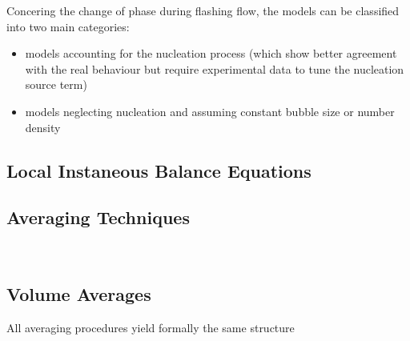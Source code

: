 \documentclass[11pt]{article}
\begin{document}
Concering the change of phase during flashing flow, the models can be classified into two main categories:
\begin{itemize}
\item models accounting for the nucleation process (which show better agreement with the real behaviour but require experimental data to tune the nucleation source term)
\item models neglecting nucleation and assuming constant bubble size or number density
\end{itemize}

\subsection{Local Instaneous Balance Equations}
\subsection{Averaging Techniques}
~\cite{bloschVolumeAveragedMacroscopicTransport1997, tryggvasonDirectNumericalSimulations2011}~\cite{ghiaasiaanTwoPhaseFlowBoiling2007, wornerCompactIntroductionNumerical}
\subsection{Volume Averages}
All averaging procedures yield formally the same structure~\cite{tryggvasonDirectNumericalSimulations2011}
\end{document}
